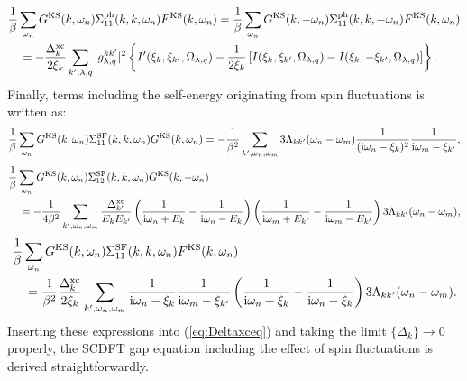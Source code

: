 %
\begin{equation}
	\begin{split}
	&\frac{1}{\beta} \sum_{\omega_n}G^{\rm KS}(k,\omega_n)\Sigma^{\rm ph}_{11}(k,k,\omega_n)F^{\rm KS}(k,\omega_n)
	=\frac{1}{\beta} \sum_{\omega_n}G^{\rm KS}(k,-\omega_n)\Sigma^{\rm ph}_{11}(k,k,-\omega_n)F^{\rm KS}(k,\omega_n)\\
	& \quad = -
	\frac{\Delta^{\rm xc}_{k}}{2\xi_{k}} \sum_{k',\lambda,q} |g^{kk'}_{\lambda,q}|^2
	\left\{ I'(\xi_k,\xi_{k'},\Omega_{\lambda,q})-\frac{1}{2\xi_k}
	\left[ I(\xi_k,\xi_{k'},\Omega_{\lambda,q}) - I(\xi_k,-\xi_{k'},\Omega_{\lambda,q}) \right]\right\}.
	\label{eq:ph11sum2}
	\end{split}
\end{equation}
%
Finally, terms including the self-energy originating from spin fluctuations is written as:
%
\begin{equation}
	\frac{1}{\beta} \sum_{\omega_n}G^{\rm KS}(k,\omega_n)\Sigma^{\rm SF}_{11}(k,k,\omega_n)G^{\rm KS}(k,\omega_n)
	= - \frac{1}{\beta^2}\sum_{k',\omega_n,\omega_m}
	3\Lambda_{kk'}(\omega_n-\omega_m)\frac{1}{({\rm i}\omega_n -\xi_{k})^2}\frac{1}{ {\rm i}\omega_m - \xi_{k'}},
	\label{eq:SF11sum1}
\end{equation}
%
\begin{equation}
	\begin{split}
	&\frac{1}{\beta} \sum_{\omega_n}G^{\rm KS}(k,\omega_n)\Sigma^{\rm SF}_{12}(k,k,\omega_n)G^{\rm KS}(k,-\omega_n)\\
	& \quad = -
	\frac{1}{4\beta^2}\sum_{k',\omega_n,\omega_m}\frac{\Delta^{\rm xc}_{k'}}{E_{k}E_{k'}}
	\left( \frac{1}{ {\rm i}\omega_n+E_k} - \frac{1}{ {\rm i}\omega_n-E_k} \right)
	\left( \frac{1}{ {\rm i}\omega_m+E_{k'}} - \frac{1}{ {\rm i}\omega_m-E_{k'}} \right)
	3\Lambda_{kk'}(\omega_n-\omega_m),
	\label{eq:SF12sum}
	\end{split}
\end{equation}
%
\begin{equation}
\begin{split}
	&\frac{1}{\beta} \sum_{\omega_n}G^{\rm KS}(k,\omega_n)\Sigma^{\rm SF}_{11}(k,k,\omega_n)F^{\rm KS}(k,\omega_n) \\
	&\quad =
	\frac{1}{\beta^2}\frac{\Delta^{\rm xc}_{k}}{2\xi_{k}}\sum_{k',\omega_n,\omega_m}
	\frac{1}{ {\rm i}\omega_n-\xi_k}\frac{1}{ {\rm i}\omega_m-\xi_{k'}}
	\left( \frac{1}{ {\rm i}\omega_n+\xi_k} - \frac{1}{ {\rm i}\omega_n-\xi_k} \right)
	3\Lambda_{kk'}(\omega_n-\omega_m).
	\label{eq:SF11sum2}
	\end{split}
\end{equation}
%
Inserting these expressions into (\ref{eq:Deltaxceq}) and taking the limit 
$\{\Delta_k\} \to 0$ properly, the SCDFT gap equation including the effect 
of spin fluctuations is derived straightforwardly.




